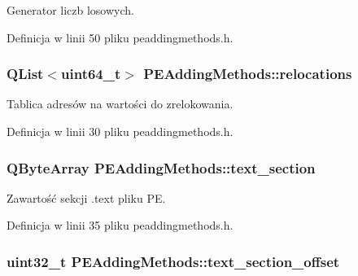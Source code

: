 Generator liczb losowych. 



Definicja w linii 50 pliku peaddingmethods.\-h.

\hypertarget{class_p_e_adding_methods_a52e354ff2cc785712a0a2fd91d1a550e}{
\subsubsection[{relocations}]{\setlength{\rightskip}{0pt plus 5cm}Q\-List$<$uint64\-\_\-t$>$ P\-E\-Adding\-Methods\-::relocations\hspace{0.3cm}{\ttfamily [private]}}}\label{class_p_e_adding_methods_a52e354ff2cc785712a0a2fd91d1a550e}


Tablica adresów na wartości do zrelokowania. 



Definicja w linii 30 pliku peaddingmethods.\-h.

\hypertarget{class_p_e_adding_methods_a3aeb84d0e21d2b26056ed9b934938692}{
\subsubsection[{text\-\_\-section}]{\setlength{\rightskip}{0pt plus 5cm}Q\-Byte\-Array P\-E\-Adding\-Methods\-::text\-\_\-section\hspace{0.3cm}{\ttfamily [private]}}}\label{class_p_e_adding_methods_a3aeb84d0e21d2b26056ed9b934938692}


Zawartość sekcji .text pliku P\-E. 



Definicja w linii 35 pliku peaddingmethods.\-h.

\hypertarget{class_p_e_adding_methods_a21614ff68440bb473986c1be1e93513b}{
\subsubsection[{text\-\_\-section\-\_\-offset}]{\setlength{\rightskip}{0pt plus 5cm}uint32\-\_\-t P\-E\-Adding\-Methods\-::text\-\_\-section\-\_\-offset\hspace{0.3cm}{\ttfamily [private]}}}\label{class_p_e_adding_methods_a21614ff68440bb473986c1be1e93513b}


